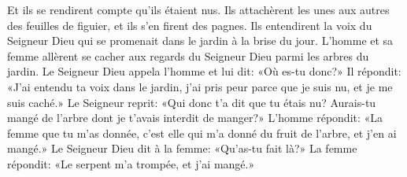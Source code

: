Et ils se rendirent compte qu’ils étaient nus.
Ils attachèrent les unes aux autres des feuilles de figuier,
	et ils s’en firent des pagnes.
Ils entendirent la voix du Seigneur Dieu
	qui se promenait dans le jardin à la brise du jour.
L’homme et sa femme allèrent se cacher aux regards du Seigneur Dieu
	parmi les arbres du jardin.
Le Seigneur Dieu appela l’homme et lui dit: «Où es-tu donc?»
Il répondit: «J’ai entendu ta voix dans le jardin,
	j’ai pris peur parce que je suis nu, et je me suis caché.»
Le Seigneur reprit: «Qui donc t’a dit que tu étais nu?
	Aurais-tu mangé de l’arbre dont je t’avais interdit de manger?»
L’homme répondit: «La femme que tu m’as donnée,
	c’est elle qui m’a donné du fruit de l’arbre, et j’en ai mangé.»
Le Seigneur Dieu dit à la femme: «Qu’as-tu fait là?»
La femme répondit: «Le serpent m’a trompée, et j’ai mangé.»

